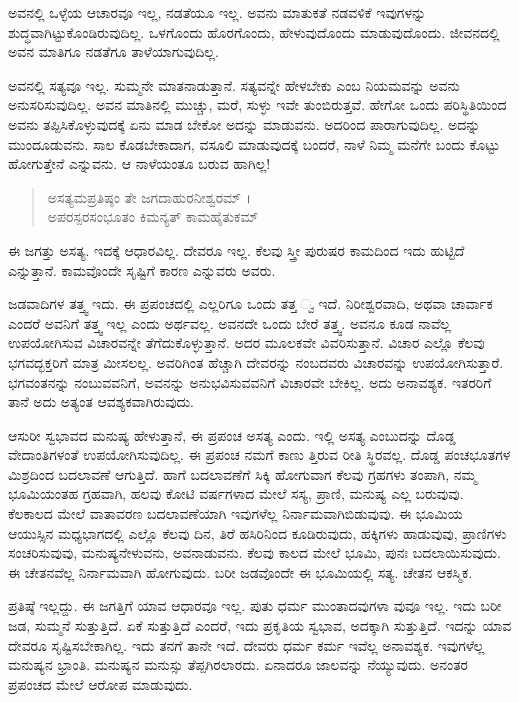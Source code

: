 ಅವನಲ್ಲಿ ಒಳ್ಳೆಯ ಆಚಾರವೂ ಇಲ್ಲ, ನಡತೆಯೂ ಇಲ್ಲ. ಅವನು ಮಾತುಕತೆ ನಡವಳಿಕೆ ಇವುಗಳನ್ನು ಶುದ್ಧವಾಗಿಟ್ಟುಕೊಂಡಿರುವುದಿಲ್ಲ. ಒಳಗೊಂದು ಹೊರಗೊಂದು, ಹೇಳುವುದೊಂದು ಮಾಡುವುದೊಂದು. ಜೀವನದಲ್ಲಿ ಅವನ ಮಾತಿಗೂ ನಡತೆಗೂ ತಾಳೆಯಾಗುವುದಿಲ್ಲ.

ಅವನಲ್ಲಿ ಸತ್ಯವೂ ಇಲ್ಲ. ಸುಮ್ಮನೇ ಮಾತನಾಡುತ್ತಾನೆ. ಸತ್ಯವನ್ನೇ ಹೇಳಬೇಕು ಎಂಬ ನಿಯಮವನ್ನು ಅವನು ಅನುಸರಿಸುವುದಿಲ್ಲ. ಅವನ ಮಾತಿನಲ್ಲಿ ಮುಚ್ಚು, ಮರೆ, ಸುಳ್ಳು ಇವೇ ತುಂಬಿರುತ್ತವೆ. ಹೇಗೋ ಒಂದು ಪರಿಸ್ಥಿತಿಯಿಂದ ಅವನು ತಪ್ಪಿಸಿಕೊಳ್ಳುವುದಕ್ಕೆ ಏನು ಮಾಡ ಬೇಕೋ ಅದನ್ನು ಮಾಡುವನು. ಅದರಿಂದ ಪಾರಾಗುವುದಿಲ್ಲ. ಅದನ್ನು ಮುಂದೂಡುವನು. ಸಾಲ ಕೊಡಬೇಕಾದಾಗ, ವಸೂಲಿ ಮಾಡುವುದಕ್ಕೆ ಬಂದರೆ, ನಾಳೆ ನಿಮ್ಮ ಮನೆಗೇ ಬಂದು ಕೊಟ್ಟು ಹೋಗುತ್ತೇನೆ ಎನ್ನುವನು. ಆ ನಾಳೆಯಂತೂ ಬರುವ ಹಾಗಿಲ್ಲ!

\begin{verse}
ಅಸತ್ಯಮಪ್ರತಿಷ್ಠಂ ತೇ ಜಗದಾಹುರನೀಶ್ವರಮ್ ।\\ಅಪರಸ್ಪರಸಂಭೂತಂ ಕಿಮನ್ಯತ್ ಕಾಮಹೈತುಕಮ್ 
\end{verse}

{\small ಈ ಜಗತ್ತು ಅಸತ್ಯ. ಇದಕ್ಕೆ ಆಧಾರವಿಲ್ಲ. ದೇವರೂ ಇಲ್ಲ. ಕೆಲವು ಸ್ತ್ರೀ ಪುರುಷರ ಕಾಮದಿಂದ ಇದು ಹುಟ್ಟಿದೆ ಎನ್ನುತ್ತಾನೆ. ಕಾಮವೊಂದೇ ಸೃಷ್ಟಿಗೆ ಕಾರಣ ಎನ್ನುವರು ಅವರು.}

ಜಡವಾದಿಗಳ ತತ್ತ್ವ ಇದು. ಈ ಪ್ರಪಂಚದಲ್ಲಿ ಎಲ್ಲರಿಗೂ ಒಂದು ತತ್ತ ್ವ ಇದೆ. ನಿರೀಶ್ವರವಾದಿ, ಅಥವಾ ಚಾರ್ವಾಕ ಎಂದರೆ ಅವನಿಗೆ ತತ್ತ್ವ ಇಲ್ಲ ಎಂದು ಅರ್ಥವಲ್ಲ. ಅವನದೇ ಒಂದು ಬೇರೆ ತತ್ತ್ವ. ಅವನೂ ಕೂಡ ನಾವೆಲ್ಲ ಉಪಯೋಗಿಸುವ ವಿಚಾರವನ್ನೇ ತೆಗೆದುಕೊಳ್ಳುತ್ತಾನೆ. ಅದರ ಮೂಲಕವೇ ವಿವರಿಸುತ್ತಾನೆ. ವಿಚಾರ ಎಲ್ಲೊ ಕೆಲವು ಭಗವದ್ಭಕ್ತರಿಗೆ ಮಾತ್ರ ಮೀಸಲಲ್ಲ. ಅವರಿಗಿಂತ ಹೆಚ್ಚಾಗಿ ದೇವರನ್ನು ನಂಬದವರು ವಿಚಾರವನ್ನು ಉಪಯೋಗಿಸುತ್ತಾರೆ. ಭಗವಂತನನ್ನು ನಂಬುವವನಿಗೆ, ಅವನನ್ನು ಅನುಭವಿಸುವವನಿಗೆ ವಿಚಾರವೇ ಬೇಕಿಲ್ಲ. ಅದು ಅನಾವಶ್ಯಕ. ಇತರರಿಗೆ ತಾನೆ ಅದು ಅತ್ಯಂತ ಆವಶ್ಯಕವಾಗಿರುವುದು.

ಆಸುರೀ ಸ್ವಭಾವದ ಮನುಷ್ಯ ಹೇಳುತ್ತಾನೆ, ಈ ಪ್ರಪಂಚ ಅಸತ್ಯ ಎಂದು. ಇಲ್ಲಿ ಅಸತ್ಯ ಎಂಬುದನ್ನು ದೊಡ್ಡ ವೇದಾಂತಿಗಳಂತೆ ಉಪಯೋಗಿಸುವುದಿಲ್ಲ. ಈ ಪ್ರಪಂಚ ನಮಗೆ ಕಾಣು ತ್ತಿರುವ ರೀತಿ ಸ್ಥಿರವಲ್ಲ. ದೊಡ್ಡ ಪಂಚಭೂತಗಳ ಮಿಶ್ರದಿಂದ ಬದಲಾವಣೆ ಆಗುತ್ತಿದೆ. ಹಾಗೆ ಬದಲಾವಣೆಗೆ ಸಿಕ್ಕಿ ಹೋಗುವಾಗ ಕೆಲವು ಗ್ರಹಗಳು ತಂಪಾಗಿ, ನಮ್ಮ ಭೂಮಿಯಂತಹ ಗ್ರಹವಾಗಿ, ಹಲವು ಕೋಟಿ ವರ್ಷಗಳಾದ ಮೇಲೆ ಸಸ್ಯ, ಪ್ರಾಣಿ, ಮನುಷ್ಯ ಎಲ್ಲ ಬರುವುವು. ಕೆಲಕಾಲದ ಮೇಲೆ ವಾತಾವರಣ ಬದಲಾವಣೆಯಾಗಿ ಇವುಗಳೆಲ್ಲ ನಿರ್ನಾಮವಾಗಿಬಿಡುವುವು. ಈ ಭೂಮಿಯ ಆಯುಸ್ಸಿನ ಮಧ್ಯಭಾಗದಲ್ಲಿ ಎಲ್ಲೊ ಕೆಲವು ದಿನ, ತಿರೆ ಹಸಿರಿನಿಂದ ಕೂಡಿರುವುದು, ಹಕ್ಕಿಗಳು ಹಾಡುವುವು, ಪ್ರಾಣಿಗಳು ಸಂಚರಿಸುವುವು, ಮನುಷ್ಯನೇಳುವನು, ಅವನಾಡುವನು. ಕೆಲವು ಕಾಲದ ಮೇಲೆ ಭೂಮಿ, ಪುನಃ ಬದಲಾಯಿಸುವುದು. ಈ ಚೇತನವೆಲ್ಲ ನಿರ್ನಾಮವಾಗಿ ಹೋಗುವುದು. ಬರೀ ಜಡವೊಂದೇ ಈ ಭೂಮಿಯಲ್ಲಿ ಸತ್ಯ. ಚೇತನ ಆಕಸ್ಮಿಕ.

ಪ್ರತಿಷ್ಠೆ ಇಲ್ಲದ್ದು. ಈ ಜಗತ್ತಿಗೆ ಯಾವ ಆಧಾರವೂ ಇಲ್ಲ. ಪುತು ಧರ್ಮ ಮುಂತಾದವುಗಳಾ ವುವೂ ಇಲ್ಲ. ಇದು ಬರೀ ಜಡ, ಸುಮ್ಮನೆ ಸುತ್ತುತ್ತಿದೆ. ಏಕೆ ಸುತ್ತುತ್ತಿದೆ ಎಂದರೆ, ಇದು ಪ್ರಕೃತಿಯ ಸ್ವಭಾವ, ಅದಕ್ಕಾಗಿ ಸುತ್ತುತ್ತಿದೆ. ಇದನ್ನು ಯಾವ ದೇವರೂ ಸೃಷ್ಟಿಸಬೇಕಾಗಿಲ್ಲ. ಇದು ತನಗೆ ತಾನೇ ಇದೆ. ದೇವರು ಧರ್ಮ ಕರ್ಮ ಇವೆಲ್ಲ ಅನಾವಶ್ಯಕ. ಇವುಗಳೆಲ್ಲ ಮನುಷ್ಯನ ಭ್ರಾಂತಿ. ಮನುಷ್ಯನ ಮನುಸ್ಸು ತೆಪ್ಪಗಿರಲಾರದು. ಏನಾದರೂ ಜಾಲವನ್ನು ನೆಯ್ಯುವುದು. ಅನಂತರ ಪ್ರಪಂಚದ ಮೇಲೆ ಆರೋಪ ಮಾಡುವುದು.

